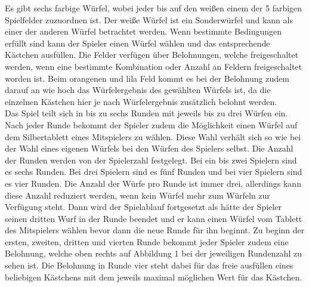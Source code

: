 Es gibt sechs farbige Würfel, wobei jeder bis auf den weißen einem der 5 farbigen Spielfelder zuzuordnen ist. Der weiße Würfel ist ein Sonderwürfel und kann als einer der anderen Würfel betrachtet werden. Wenn bestimmte Bedingungen erfüllt sind kann der Spieler einen Würfel wählen und das entsprechende Kästchen ausfüllen. Die Felder verfügen über Belohnungen, welche freigeschaltet werden, wenn eine bestimmte Kombination oder Anzahl an Feldern freigeschaltet worden ist. Beim orangenen und lila Feld kommt es bei der Belohnung zudem darauf an wie hoch das Würfelergebnis des gewählten Würfels ist, da die einzelnen Kästchen hier je nach Würfelergebnis zusätzlich belohnt werden.
\\
Das Spiel teilt sich in bis zu sechs Runden mit jeweils bis zu drei Würfen ein. Nach jeder Runde bekommt der Spieler zudem die Möglichkeit einen Würfel auf dem Silbertablett eines Mitspielers zu wählen. Diese Wahl verhält sich so wie bei der Wahl eines eigenen Würfels bei den Würfen des Spielers selbst. Die Anzahl der Runden werden von der Spielerzahl festgelegt. Bei ein bis zwei Spielern sind es sechs Runden. Bei drei Spielern sind es fünf Runden und bei vier Spielern sind es vier Runden. Die Anzahl der Würfe pro Runde ist immer drei, allerdings kann diese Anzahl reduziert werden, wenn kein Würfel mehr zum Würfeln zur Verfügung steht. Dann wird der Spielablauf fortgesetzt als hätte der Spieler seinen dritten Wurf in der Runde beendet und er kann einen Würfel vom Tablett des Mitspielers wählen bevor dann die neue Runde für ihn beginnt. Zu beginn der ersten, zweiten, dritten und vierten Runde bekommt jeder Spieler zudem eine Belohnung, welche oben rechts auf Abbildung 1 bei der jeweiligen Rundenzahl zu sehen ist. Die Belohnung in Runde vier steht dabei für das freie ausfüllen eines beliebigen Kästchens mit dem jeweils maximal möglichen Wert für das Kästchen.

